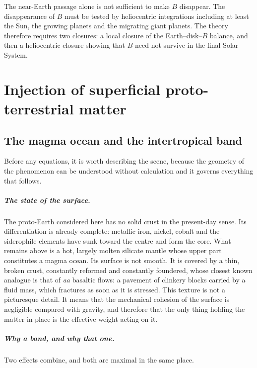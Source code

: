 \documentclass[11pt,a4paper,openany]{report}
\begin{document}
\begin{controle}
The near-Earth passage alone is not sufficient to make $B$ disappear. The disappearance of $B$
must be tested by heliocentric integrations including at least the Sun, the growing planets and the
migrating giant planets. The theory therefore requires two closures: a local closure of the
Earth--disk--$B$ balance, and then a heliocentric closure showing that $B$ need not survive in the
final Solar System.
\end{controle}

\chapter{Injection of superficial proto-terrestrial matter}
\label{ch:injection}

\section{The magma ocean and the intertropical band}
\label{sec:bande}

Before any equations, it is worth describing the scene, because the geometry of the phenomenon can
be understood without calculation and it governs everything that follows.

\paragraph{The state of the surface.} The proto-Earth considered here has no solid crust in the
present-day sense. Its differentiation is already complete: metallic iron, nickel, cobalt and the
siderophile elements have sunk toward the centre and form the core. What remains above is a hot,
largely molten silicate mantle whose upper part constitutes a magma ocean. Its surface is not
smooth. It is covered by a thin, broken crust, constantly reformed and constantly foundered, whose
closest known analogue is that of \emph{aa} basaltic flows: a pavement of clinkery blocks carried
by a fluid mass, which fractures as soon as it is stressed. This texture is not a picturesque
detail. It means that the mechanical cohesion of the surface is negligible compared with gravity,
and therefore that the only thing holding the matter in place is the effective weight acting on it.

\paragraph{Why a band, and why that one.} Two effects combine, and both are maximal in the same
place.
\end{document}
